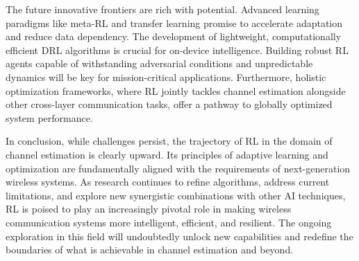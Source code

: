 \documentclass[journal,twocolumn]{IEEEtran}
\begin{document}
The future innovative frontiers are rich with potential. Advanced learning paradigms like meta-RL and transfer learning promise to accelerate adaptation and reduce data dependency. The development of lightweight, computationally efficient DRL algorithms is crucial for on-device intelligence. Building robust RL agents capable of withstanding adversarial conditions and unpredictable dynamics will be key for mission-critical applications. Furthermore, holistic optimization frameworks, where RL jointly tackles channel estimation alongside other cross-layer communication tasks, offer a pathway to globally optimized system performance.

In conclusion, while challenges persist, the trajectory of RL in the domain of channel estimation is clearly upward. Its principles of adaptive learning and optimization are fundamentally aligned with the requirements of next-generation wireless systems. As research continues to refine algorithms, address current limitations, and explore new synergistic combinations with other AI techniques, RL is poised to play an increasingly pivotal role in making wireless communication systems more intelligent, efficient, and resilient. The ongoing exploration in this field will undoubtedly unlock new capabilities and redefine the boundaries of what is achievable in channel estimation and beyond.


\ifCLASSOPTIONcaptionsoff
  \newpage
\fi




\end{document}
